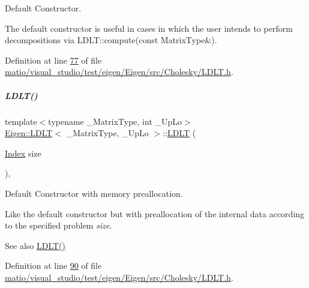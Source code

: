 Default Constructor. 

The default constructor is useful in cases in which the user intends to perform decompositions via L\+D\+L\+T\+::compute(const Matrix\+Type\&). 

Definition at line \hyperlink{matio_2visual__studio_2test_2eigen_2_eigen_2src_2_cholesky_2_l_d_l_t_8h_source_l00077}{77} of file \hyperlink{matio_2visual__studio_2test_2eigen_2_eigen_2src_2_cholesky_2_l_d_l_t_8h_source}{matio/visual\+\_\+studio/test/eigen/\+Eigen/src/\+Cholesky/\+L\+D\+L\+T.\+h}.

\mbox{\label{group___cholesky___module_a154aa41bd2460199d48861eaf5e4f597}} 
\subparagraph{\texorpdfstring{L\+D\+L\+T()}{LDLT()}\hspace{0.1cm}{\footnotesize\ttfamily [6/8]}}
{\footnotesize\ttfamily template$<$typename \+\_\+\+Matrix\+Type, int \+\_\+\+Up\+Lo$>$ \\
\hyperlink{group___cholesky___module_class_eigen_1_1_l_d_l_t}{Eigen\+::\+L\+D\+LT}$<$ \+\_\+\+Matrix\+Type, \+\_\+\+Up\+Lo $>$\+::\hyperlink{group___cholesky___module_class_eigen_1_1_l_d_l_t}{L\+D\+LT} (\begin{DoxyParamCaption}\item[{\hyperlink{group___cholesky___module_ad9c57eb2fb3bbccd51b9d2e111bea355}{Index}}]{size }\end{DoxyParamCaption})\hspace{0.3cm}{\ttfamily [inline]}, {\ttfamily [explicit]}}



Default Constructor with memory preallocation. 

Like the default constructor but with preallocation of the internal data according to the specified problem {\itshape size}. \begin{DoxySeeAlso}{See also}
\hyperlink{group___cholesky___module_a2e06dedd2651649c5b251fbf9ba4e7d4}{L\+D\+L\+T()} 
\end{DoxySeeAlso}


Definition at line \hyperlink{matio_2visual__studio_2test_2eigen_2_eigen_2src_2_cholesky_2_l_d_l_t_8h_source_l00090}{90} of file \hyperlink{matio_2visual__studio_2test_2eigen_2_eigen_2src_2_cholesky_2_l_d_l_t_8h_source}{matio/visual\+\_\+studio/test/eigen/\+Eigen/src/\+Cholesky/\+L\+D\+L\+T.\+h}.

